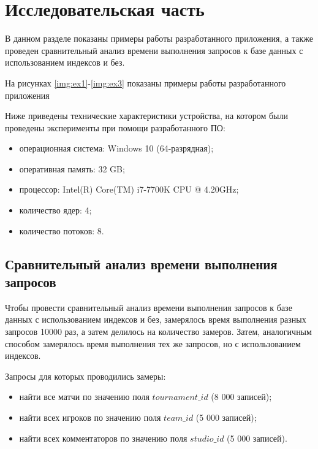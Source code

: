 \chapter{Исследовательская часть}
\label{cha:research}

В данном разделе показаны примеры работы разработанного приложения, а также проведен сравнительный анализ времени выполнения запросов к базе данных с использованием индексов и без.

На рисунках \ref{img:ex1}-\ref{img:ex3} показаны примеры работы разработанного приложения




Ниже приведены технические характеристики устройства, на котором были проведены эксперименты при помощи разработанного ПО:
\begin{itemize}
	\item операционная система: Windows 10 (64-разрядная);
	\item оперативная память: 32 GB;
	\item процессор: Intel(R) Core(TM) i7-7700K CPU @ 4.20GHz;
	\item количество ядер: 4;
	\item количество потоков: 8.
\end{itemize}

\section{Сравнительный анализ времени выполнения запросов}

Чтобы провести сравнительный анализ времени выполнения запросов к базе данных с использованием индексов и без, замерялось время выполнения разных запросов 10000 раз, а затем делилось на количество замеров. Затем, аналогичным способом замерялось время выполнения тех же запросов, но с использованием индексов.

Запросы для которых проводились замеры:
\begin{itemize}
	\item найти все матчи по значению поля $tournament\_id$ (8 000 записей);
	\item найти всех игроков по значению поля $team\_id$ (5 000 записей);
	\item найти всех комментаторов по значению поля $studio\_id$ (5 000 записей).
\end{itemize}

